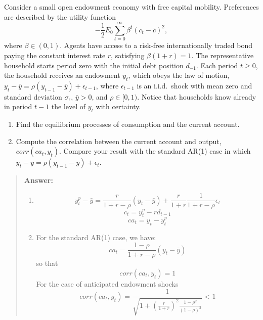\begin{exercise} 
Consider a small open  endowment economy with free capital mobility.  Preferences are described by the utility function
\[
-\frac 12E_0 \sum_{t=0}^{\infty} \beta^t (c_t-\overline{c})^2,
\]
where  $\beta\in (0,1)$.
Agents have access to a risk-free internationally traded  bond paying the constant interest rate $r$, satisfying $\beta (1+r)=1$.
The representative household starts period zero with the initial debt position $d_{-1}$. Each period $t\ge 0$, the household receives an endowment $y_t$, which obeys the law of motion, $y_t-\bar{y} = \rho (y_{t-1}-\bar{y}) + \epsilon_{t-1}$, where $\epsilon_{t-1}$ is an i.i.d.\ shock with mean zero and standard deviation $\sigma_{\epsilon}$, $\bar{y}>0$, and  $\rho\in[0,1)$. Notice that households know already in period $t-1$ the level of $y_t$ with certainty. 
\begin{enumerate}
\item Find the equilibrium processes of consumption and the current account. 
\item Compute the correlation between the current account and output, $corr(ca_t, y_t)$. Compare your result with the standard AR(1) case in which $y_{t}-\bar{y} = \rho \left(y_{t-1}-\bar{y}\right) + \epsilon_t$.
\end{enumerate}
\begin{quote}
{\bf  Answer:} 
\begin{enumerate}
\item 
\[
y^p_t -\bar{y} = \frac{r}{1+r-\rho} (y_t -\bar{y}) + \frac{r}{1+r }\frac{1}{1+r-\rho} \epsilon_t
\]
\[
c_t = y^p_t -r d_{t-1}
\]
\[
ca_t = y_t-y^p_t
\]
\item 
For the standard AR(1) case, we have: 
\[
ca_t = \frac{1-\rho}{1+r-\rho} (y_t -\bar{y})
\]
so that 
\[
corr(ca_t, y_t) =1
\]
For the case of anticipated endowment shocks
\[
corr(ca_t, y_t) =\frac{1}{\sqrt{1 + \left(\frac{r}{1+r}\right)^2 \frac{1-\rho^2}{(1-\rho)^2}}}
<1\]
\end{enumerate}
\end{quote}
\end{exercise}


